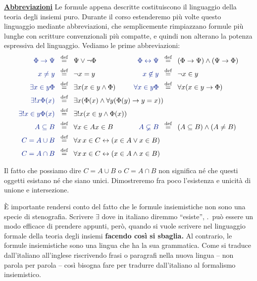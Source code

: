 \def\dohboxm#1#2{\hbox #1{$\displaystyle #2$\hss}}
\def\hboxm#1#{\dohboxm{#1}}
\textbf{\underline{Abbreviazioni}}
Le formule appena descritte costituiscono il linguaggio della teoria degli
insiemi {\drkred puro.} Durante il corso estenderemo
pi\`u volte questo linguaggio mediante abbreviazioni, che semplicemente rimpiazzano formule pi\`u lunghe con scritture convenzionali pi\`u compatte, e quindi non alterano 
la potenza espressiva del linguaggio. Vediamo le prime abbreviazioni:
\def\pippo{\;\;\Mydef\;\;}
\begin{align*}
{\drkblu {\drkblu \Phi \rightarrow \Psi} }&\pippo \Psi \lor \neg \Phi  &{\drkblu  \Phi \leftrightarrow \Psi }&\pippo (\Phi \rightarrow \Psi) \land (\Psi \rightarrow \Phi) \\
{\drkblu x \ne y }&\pippo \neg x = y  &{\drkblu  x \not\in y }&\pippo \neg x \in y  \\
{\drkblu \exists {x \in y} \Phi }&\pippo \exists x (x \in y \land \Phi) & {\drkblu \forall {x \in y} \Phi} &\pippo \forall x (x \in y \rightarrow \Phi) \\
{\drkblu \exists ! x \Phi(x) }&\pippo \mathrlap{\exists x (\Phi(x) \land \forall y(\Phi(y) \rightarrow y = x))} \\
{\drkblu \exists ! {x \in y} \Phi(x) }&\pippo \exists ! x (x \in y \land \Phi(x)) \\
{\drkblu A \subseteq B }&\pippo \forall {x \in A} x \in B &{\drkblu  A \subsetneq B }&\pippo( A \subseteq B) \land (A \ne B) \\
{\drkblu C = A \cup B }&\pippo \mathrlap{\forall x \, x \in C \leftrightarrow (x \in A \lor x \in B)} \\
{\drkblu C = A \cap B }&\pippo \mathrlap{\forall x \, x \in C \leftrightarrow (x \in A \land x \in B)}
\end{align*}
\begin{note}
	Il fatto che possiamo dire $C = A \cup B$ o $C = A \cap B$ non significa n\'e che questi oggetti esistano n\'e che siano unici. Dimostreremo fra poco l'esistenza e unicit\`a 
	di unione e intersezione.
\end{note}

\`E importante rendersi conto del fatto che le formule insiemistiche non
sono una specie di stenografia. Scrivere $\exists$ dove in italiano
diremmo ``esiste'', \etc.\ pu\`o essere un modo efficace di prendere
appunti, per\`o, quando si vuole scrivere nel linguaggio formale della
teoria degli insiemi \textbf{\drkred facendo cos\`i si sbaglia.} Al
contrario, le formule insiemistiche sono una lingua che ha la sua
grammatica. Come si traduce dall'italiano all'inglese riscrivendo frasi o
paragrafi nella nuova lingua -- non parola per parola -- cos\`i bisogna fare
per tradurre dall'italiano al formalismo insiemistico.

